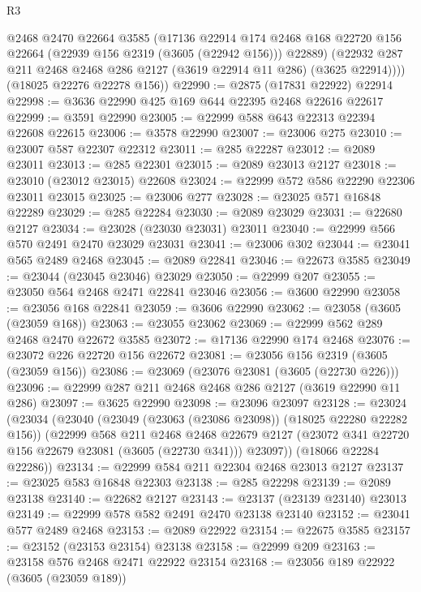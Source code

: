 \begin{lexlean}{R3}
\begin{coremodule}
          @2468
          @2470
          @22664
          @3585
          (@17136
            @22914
            @174
            @2468
            @168
            @22720
            @156
            @22664
            (@22939 @156 @2319 (@3605 (@22942 @156)))
            @22889)
          (@22932 @287 @211 @2468 @2468 @286 @2127 (@3619 @22914 @11 @286) (@3625 @22914))))
      (@18025 @22276 @22278 @156))
@22990 := @2875 (@17831 @22922) @22914
@22998 := @3636 @22990 @425 @169 @644 @22395 @2468 @22616 @22617
@22999 := @3591 @22990
@23005 := @22999 @588 @643 @22313 @22394 @22608 @22615
@23006 := @3578 @22990
@23007 := @23006 @275
@23010 := @23007 @587 @22307 @22312
@23011 := @285 @22287
@23012 := @2089 @23011
@23013 := @285 @22301
@23015 := @2089 @23013 @2127
@23018 := @23010 (@23012 @23015) @22608
@23024 := @22999 @572 @586 @22290 @22306 @23011 @23015
@23025 := @23006 @277
@23028 := @23025 @571 @16848 @22289
@23029 := @285 @22284
@23030 := @2089 @23029
@23031 := @22680 @2127
@23034 := @23028 (@23030 @23031) @23011
@23040 := @22999 @566 @570 @2491 @2470 @23029 @23031
@23041 := @23006 @302
@23044 := @23041 @565 @2489 @2468
@23045 := @2089 @22841
@23046 := @22673 @3585
@23049 := @23044 (@23045 @23046) @23029
@23050 := @22999 @207
@23055 := @23050 @564 @2468 @2471 @22841 @23046
@23056 := @3600 @22990
@23058 := @23056 @168 @22841
@23059 := @3606 @22990
@23062 := @23058 (@3605 (@23059 @168))
@23063 := @23055 @23062
@23069 := @22999 @562 @289 @2468 @2470 @22672 @3585
@23072 := @17136 @22990 @174 @2468
@23076 := @23072 @226 @22720 @156 @22672
@23081 := @23056 @156 @2319 (@3605 (@23059 @156))
@23086 := @23069 (@23076 @23081 (@3605 (@22730 @226)))
@23096 := @22999 @287 @211 @2468 @2468 @286 @2127 (@3619 @22990 @11 @286)
@23097 := @3625 @22990
@23098 := @23096 @23097
@23128 := @23024
    (@23034
      (@23040
        (@23049 (@23063 (@23086 @23098)) (@18025 @22280 @22282 @156))
        (@22999
          @568
          @211
          @2468
          @2468
          @22679
          @2127
          (@23072 @341 @22720 @156 @22679 @23081 (@3605 (@22730 @341)))
          @23097))
      (@18066 @22284 @22286))
@23134 := @22999 @584 @211 @22304 @2468 @23013 @2127
@23137 := @23025 @583 @16848 @22303
@23138 := @285 @22298
@23139 := @2089 @23138
@23140 := @22682 @2127
@23143 := @23137 (@23139 @23140) @23013
@23149 := @22999 @578 @582 @2491 @2470 @23138 @23140
@23152 := @23041 @577 @2489 @2468
@23153 := @2089 @22922
@23154 := @22675 @3585
@23157 := @23152 (@23153 @23154) @23138
@23158 := @22999 @209
@23163 := @23158 @576 @2468 @2471 @22922 @23154
@23168 := @23056 @189 @22922 (@3605 (@23059 @189))

\end{coremodule}
\end{lexlean}

